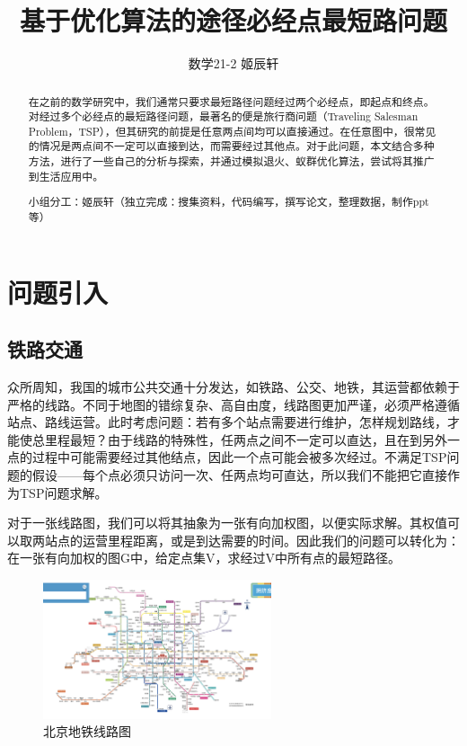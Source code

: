 \documentclass[12pt]{article}
\begin{document}
\title{基于优化算法的途径必经点最短路问题}
\author{数学21-2 姬辰轩}
\maketitle
\begin{abstract}
在之前的数学研究中，我们通常只要求最短路径问题经过两个必经点，即起点和终点。对经过多个必经点的最短路径问题，最著名的便是旅行商问题（Traveling Salesman Problem，TSP），但其研究的前提是任意两点间均可以直接通过。在任意图中，很常见的情况是两点间不一定可以直接到达，而需要经过其他点。对于此问题，本文结合多种方法，进行了一些自己的分析与探索，并通过模拟退火、蚁群优化算法，尝试将其推广到生活应用中。

小组分工：姬辰轩（独立完成：搜集资料，代码编写，撰写论文，整理数据，制作ppt等）
\end{abstract}
\newpage
\tableofcontents
\newpage
\section{问题引入}
\subsection{铁路交通}
众所周知，我国的城市公共交通十分发达，如铁路、公交、地铁，其运营都依赖于严格的线路。不同于地图的错综复杂、高自由度，线路图更加严谨，必须严格遵循站点、路线运营。此时考虑问题：若有多个站点需要进行维护，怎样规划路线，才能使总里程最短？由于线路的特殊性，任两点之间不一定可以直达，且在到另外一点的过程中可能需要经过其他结点，因此一个点可能会被多次经过。不满足TSP问题的假设——每个点必须只访问一次、任两点均可直达，所以我们不能把它直接作为TSP问题求解。

对于一张线路图，我们可以将其抽象为一张有向加权图，以便实际求解。其权值可以取两站点的运营里程距离，或是到达需要的时间。因此我们的问题可以转化为：在一张有向加权的图G中，给定点集V，求经过V中所有点的最短路径。
\begin{figure}[h]
    \centering
    \includegraphics[width = 0.6\textwidth]{assets/bjsubway.jpeg}
    \caption{\label{fig:bjsubway.jpeg}北京地铁线路图}
\end{figure}
\end{document}
